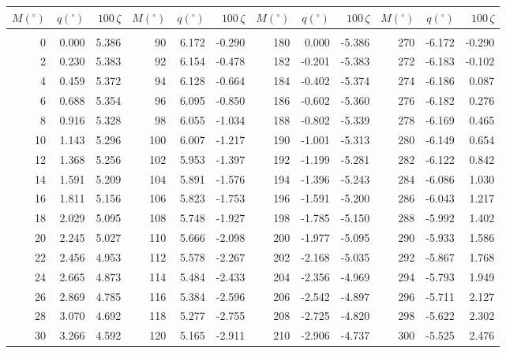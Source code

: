 \newpage
\begin{table}\centering
\small{ \begin{tabular}{rrr|rrr|rrr|rrr}
$M(^\circ)$ & $q(^\circ)$  & $100\,\zeta$ & $M(^\circ)$ & $q(^\circ)$  & $100\,\zeta$ & $M(^\circ)$ & $q(^\circ)$  & $100\,\zeta$& $M(^\circ)$ & $q(^\circ)$  & $100\,\zeta$\\\hline
&&&&&&&&&&&\\[-1.75ex]
  0 &   0.000 &  5.386 &  90 &   6.172 & -0.290 & 180 &   0.000 & -5.386 & 270 &  -6.172 & -0.290\\
  2 &   0.230 &  5.383 &  92 &   6.154 & -0.478 & 182 &  -0.201 & -5.383 & 272 &  -6.183 & -0.102\\
  4 &   0.459 &  5.372 &  94 &   6.128 & -0.664 & 184 &  -0.402 & -5.374 & 274 &  -6.186 &  0.087\\
  6 &   0.688 &  5.354 &  96 &   6.095 & -0.850 & 186 &  -0.602 & -5.360 & 276 &  -6.182 &  0.276\\
  8 &   0.916 &  5.328 &  98 &   6.055 & -1.034 & 188 &  -0.802 & -5.339 & 278 &  -6.169 &  0.465\\
 10 &   1.143 &  5.296 & 100 &   6.007 & -1.217 & 190 &  -1.001 & -5.313 & 280 &  -6.149 &  0.654\\
 12 &   1.368 &  5.256 & 102 &   5.953 & -1.397 & 192 &  -1.199 & -5.281 & 282 &  -6.122 &  0.842\\
 14 &   1.591 &  5.209 & 104 &   5.891 & -1.576 & 194 &  -1.396 & -5.243 & 284 &  -6.086 &  1.030\\
 16 &   1.811 &  5.156 & 106 &   5.823 & -1.753 & 196 &  -1.591 & -5.200 & 286 &  -6.043 &  1.217\\
 18 &   2.029 &  5.095 & 108 &   5.748 & -1.927 & 198 &  -1.785 & -5.150 & 288 &  -5.992 &  1.402\\
 20 &   2.245 &  5.027 & 110 &   5.666 & -2.098 & 200 &  -1.977 & -5.095 & 290 &  -5.933 &  1.586\\
 22 &   2.456 &  4.953 & 112 &   5.578 & -2.267 & 202 &  -2.168 & -5.035 & 292 &  -5.867 &  1.768\\
 24 &   2.665 &  4.873 & 114 &   5.484 & -2.433 & 204 &  -2.356 & -4.969 & 294 &  -5.793 &  1.949\\
 26 &   2.869 &  4.785 & 116 &   5.384 & -2.596 & 206 &  -2.542 & -4.897 & 296 &  -5.711 &  2.127\\
 28 &   3.070 &  4.692 & 118 &   5.277 & -2.755 & 208 &  -2.725 & -4.820 & 298 &  -5.622 &  2.302\\
 30 &   3.266 &  4.592 & 120 &   5.165 & -2.911 & 210 &  -2.906 & -4.737 & 300 &  -5.525 &  2.476\\

\end{tabular}}
\end{table}
